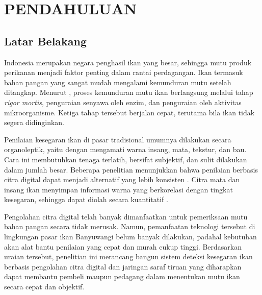 \chapter{PENDAHULUAN}
\label{chap:pendahuluan}

\section{Latar Belakang}

Indonesia merupakan negara penghasil ikan yang besar, sehingga mutu
produk perikanan menjadi faktor penting dalam rantai perdagangan.
Ikan termasuk bahan pangan yang sangat mudah mengalami kemunduran mutu
setelah ditangkap. Menurut \citet{estiasih2015}, proses kemunduran mutu
ikan berlangsung melalui tahap \textit{rigor mortis}, penguraian
senyawa oleh enzim, dan penguraian oleh aktivitas mikroorganisme.
Ketiga tahap tersebut berjalan cepat, terutama bila ikan tidak segera
didinginkan.

Penilaian kesegaran ikan di pasar tradisional umumnya dilakukan secara
organoleptik, yaitu dengan mengamati warna insang, mata, tekstur, dan
bau. Cara ini membutuhkan tenaga terlatih, bersifat subjektif, dan sulit
dilakukan dalam jumlah besar. Beberapa penelitian menunjukkan bahwa
penilaian berbasis citra digital dapat menjadi alternatif yang lebih
konsisten \citep{prasetyo2021}. Citra mata dan insang ikan menyimpan
informasi warna yang berkorelasi dengan tingkat kesegaran, sehingga
dapat diolah secara kuantitatif \citep{gonzalez2018}.

Pengolahan citra digital telah banyak dimanfaatkan untuk pemeriksaan
mutu bahan pangan secara tidak merusak. Namun, pemanfaatan teknologi
tersebut di lingkungan pasar ikan Banyuwangi belum banyak dilakukan,
padahal kebutuhan akan alat bantu penilaian yang cepat dan murah cukup
tinggi. Berdasarkan uraian tersebut, penelitian ini merancang bangun
sistem deteksi kesegaran ikan berbasis pengolahan citra digital dan
jaringan saraf tiruan yang diharapkan dapat membantu pembeli maupun
pedagang dalam menentukan mutu ikan secara cepat dan objektif.


